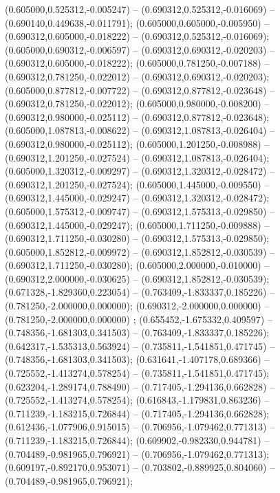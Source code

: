  (0.605000,0.525312,-0.005247) -- (0.690312,0.525312,-0.016069) -- (0.690140,0.449638,-0.011791);
 (0.605000,0.605000,-0.005950) -- (0.690312,0.605000,-0.018222) -- (0.690312,0.525312,-0.016069);
 (0.605000,0.690312,-0.006597) -- (0.690312,0.690312,-0.020203) -- (0.690312,0.605000,-0.018222);
 (0.605000,0.781250,-0.007188) -- (0.690312,0.781250,-0.022012) -- (0.690312,0.690312,-0.020203);
 (0.605000,0.877812,-0.007722) -- (0.690312,0.877812,-0.023648) -- (0.690312,0.781250,-0.022012);
 (0.605000,0.980000,-0.008200) -- (0.690312,0.980000,-0.025112) -- (0.690312,0.877812,-0.023648);
 (0.605000,1.087813,-0.008622) -- (0.690312,1.087813,-0.026404) -- (0.690312,0.980000,-0.025112);
 (0.605000,1.201250,-0.008988) -- (0.690312,1.201250,-0.027524) -- (0.690312,1.087813,-0.026404);
 (0.605000,1.320312,-0.009297) -- (0.690312,1.320312,-0.028472) -- (0.690312,1.201250,-0.027524);
 (0.605000,1.445000,-0.009550) -- (0.690312,1.445000,-0.029247) -- (0.690312,1.320312,-0.028472);
 (0.605000,1.575312,-0.009747) -- (0.690312,1.575313,-0.029850) -- (0.690312,1.445000,-0.029247);
 (0.605000,1.711250,-0.009888) -- (0.690312,1.711250,-0.030280) -- (0.690312,1.575313,-0.029850);
 (0.605000,1.852812,-0.009972) -- (0.690312,1.852812,-0.030539) -- (0.690312,1.711250,-0.030280);
 (0.605000,2.000000,-0.010000) -- (0.690312,2.000000,-0.030625) -- (0.690312,1.852812,-0.030539);
 (0.671328,-1.829360,0.223054) -- (0.763409,-1.833337,0.185226) -- (0.781250,-2.000000,0.000000);
 (0.690312,-2.000000,0.000000) -- (0.781250,-2.000000,0.000000) ;
 (0.655452,-1.675332,0.409597) -- (0.748356,-1.681303,0.341503) -- (0.763409,-1.833337,0.185226);
 (0.642317,-1.535313,0.563924) -- (0.735811,-1.541851,0.471745) -- (0.748356,-1.681303,0.341503);
 (0.631641,-1.407178,0.689366) -- (0.725552,-1.413274,0.578254) -- (0.735811,-1.541851,0.471745);
 (0.623204,-1.289174,0.788490) -- (0.717405,-1.294136,0.662828) -- (0.725552,-1.413274,0.578254);
 (0.616843,-1.179831,0.863236) -- (0.711239,-1.183215,0.726844) -- (0.717405,-1.294136,0.662828);
 (0.612436,-1.077906,0.915015) -- (0.706956,-1.079462,0.771313) -- (0.711239,-1.183215,0.726844);
 (0.609902,-0.982330,0.944781) -- (0.704489,-0.981965,0.796921) -- (0.706956,-1.079462,0.771313);
 (0.609197,-0.892170,0.953071) -- (0.703802,-0.889925,0.804060) -- (0.704489,-0.981965,0.796921);
